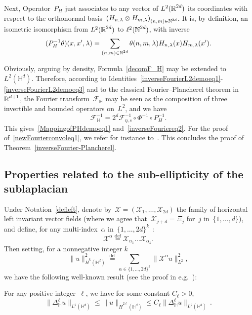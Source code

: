 \documentclass[AHL,Unicode,longabstracts]{cedram}
\def\N{\mathop{\mathbb N\kern 0pt}\nolimits}
\def\R{{\mathop{\mathbb R\kern 0pt}\nolimits}}
\newcommand*\bbH{\mathbb{H}}
\newcommand{\lam}{\lambda}
\newcommand*\cF{\mathcal{F}}
\newcommand*\cX{\mathcal{X}}
\newcommand*\N{\mathbb{N}}
\newcommand*\R{\mathbb{R}}
\newcommand*\bbH{\mathbb{H}}
\newcommand*\eqdefa{\overset{\mathrm{def}}{=}}
\begin{document}
Next, Operator~$P_H$ just associates to any vector of $L^2(\R^{2d})$ its coordinates with respect to the orthonormal basis~$\left(H_{n,\lam}\otimes H_{m,\lam} \right)_{(n,m)\in \N^{2d}}$. It is, by definition, an isometric isomorphism from $L^2(\R^{2d})$ to $\ell^2(\N^{2d})$, with inverse
\begin{equation}\label{inverseFourierL2demoeq3}
(P_H^{-1} \theta)(x,x',\lam) = \sum_{(n,m)\in \N^{2d}} \theta(n,m,\lam) H_{n,\lam} (x) H_{m,\lam}(x').
\end{equation}

Obviously, arguing by density, Formula~\eqref{decomF_H} may be extended to $L^2(\bbH^d)$. Therefore, according to Identities~\eqref{inverseFourierL2demoeq1}-\eqref{inverseFourierL2demoeq3} and to the classical Fourier--Plancherel theorem in~$\R^{d+1}$, the Fourier transform~$\cF_\bbH$ may be seen as the composition of three invertible and bounded operators on~$L^2$, and we have
\[
\cF_\bbH^{-1} = 2^d \cF_{\eta,s}^{-1} \circ \Phi^{-1} \circ P_H^{-1}.
\]
This gives~\eqref{MappingofPHdemoeq1} and~\eqref{inverseFouriereq2}. For the proof of~\eqref{newFourierconvoleq1}, we refer for instance to~\cite{bcdFHspace}. This concludes the proof of Theorem~\ref{inverseFourier-Plancherel}.

\subsection{Properties related to the sub-ellipticity of the sublaplacian} \label{subellipticity}

Under Notation~\eqref{defleft}, denote by~${\cX}=(\cX_1,\dots,\cX_{2d})$ the family of horizontal left invariant vector fields (where we agree that~$\cX_{j+d}=\Xi_j$ for~$j$ in~$ \{1,\dots, d\}$), and define, for any multi-index~$\alpha$ in~$ \{1,\dots, 2d\}^k$~:
\begin{equation}\label{prodreal}
\mathcal{\cX}^{\alpha} \eqdefa \cX_{\alpha_1}\dots
\cX_{\alpha_k}.
\end{equation}
Then setting, for a nonnegative integer $k$
\[
\|u\|_{\dot H^k(\bbH^d)}^2 \eqdefa \sum_{\alpha\in \{1,\dots,2d\}^k} \|\cX^\alpha u\|_{L^2}^2,
\]
we have the following well-known result (see the proof in e.g.~\cite{CCX,H}):

\begin{theo}\label{maximalestimatepaire}
For any positive integer~$\ell$, we have for some constant $C_\ell>0$,
\[
\|\Delta_{\bbH} ^\ell u\|_{L^2(\bbH^d)}\leq \|u\|_{\dot H^{2\ell}(\bbH^d)}
\leq C_\ell\|\Delta_{\bbH} ^\ell u\|_{L^2(\bbH^d)}\,.
\]
\end{theo}
\end{document}
